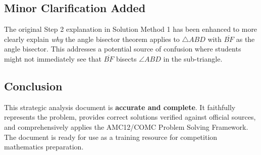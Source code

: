 \documentclass[12pt]{article}
\begin{document}
\subsection*{Minor Clarification Added}

The original Step 2 explanation in Solution Method 1 has been enhanced to more clearly explain \emph{why} the angle bisector theorem applies to $\triangle ABD$ with $\overline{BF}$ as the angle bisector. This addresses a potential source of confusion where students might not immediately see that $\overline{BF}$ bisects $\angle ABD$ in the sub-triangle.

\subsection*{Conclusion}

This strategic analysis document is \textbf{accurate and complete}. It faithfully represents the problem, provides correct solutions verified against official sources, and comprehensively applies the AMC12/COMC Problem Solving Framework. The document is ready for use as a training resource for competition mathematics preparation.

\vspace{0.5cm}

\begin{center}
\end{center}
\end{document}
